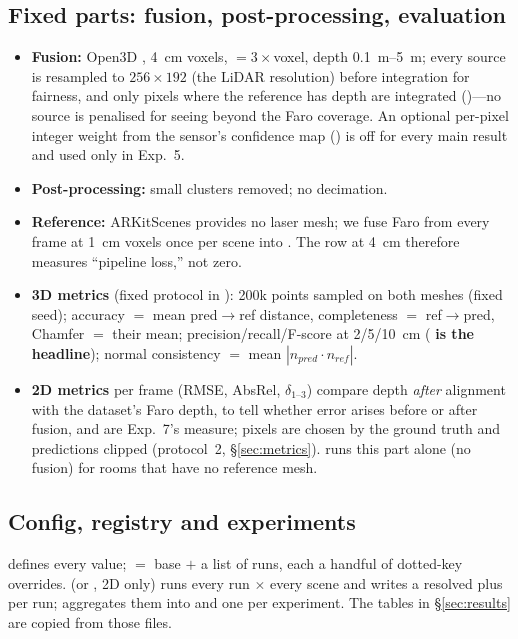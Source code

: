 \subsection{Fixed parts: fusion, post-processing, evaluation}
\begin{itemize}
\item \textbf{Fusion:} Open3D , \SI{4}{cm} voxels, $=3\times$voxel,
depth \SIrange{0.1}{5}{m}; every source is resampled to $256\times192$ (the LiDAR resolution) before integration for
fairness, and only pixels where the reference has depth are integrated ()---no source is penalised
for seeing beyond the Faro coverage. An optional per-pixel integer weight from the sensor's confidence map
() is off for every main result and used only in Exp.~5.
\item \textbf{Post-processing:} small clusters removed; no decimation.
\item \textbf{Reference:} ARKitScenes provides no laser mesh; we fuse Faro  from every frame at
\SI{1}{cm} voxels once per scene into . The  row at \SI{4}{cm} therefore measures
``pipeline loss,'' not zero.
\item \textbf{3D metrics} (fixed protocol in ): 200k points sampled on both meshes (fixed seed);
accuracy $=$ mean pred$\rightarrow$ref distance, completeness $=$ ref$\rightarrow$pred, Chamfer $=$ their mean;
precision/recall/F-score at \SI{2}{}/\SI{5}{}/\SI{10}{cm} (\textbf{\fscore{} is the headline}); normal consistency
$=$ mean $|n_{pred}\cdot n_{ref}|$.
\item \textbf{2D metrics} per frame (RMSE, AbsRel, $\delta_{1\text{--}3}$) compare depth \emph{after} alignment with the
dataset's Faro depth, to tell whether error arises before or after fusion, and are Exp.~7's measure; pixels are chosen
by the ground truth and predictions clipped (protocol~2, \S\ref{sec:metrics}).  runs this part
alone (no fusion) for rooms that have no reference mesh.
\end{itemize}

\subsection{Config, registry and experiments}
 defines every value;  $=$ base $+$ a list of runs, each a
handful of dotted-key overrides.  (or , 2D only) runs every run $\times$ every scene and writes a resolved
 plus  per run;  aggregates them into 
and one  per experiment. The tables in \S\ref{sec:results} are copied from those files.


